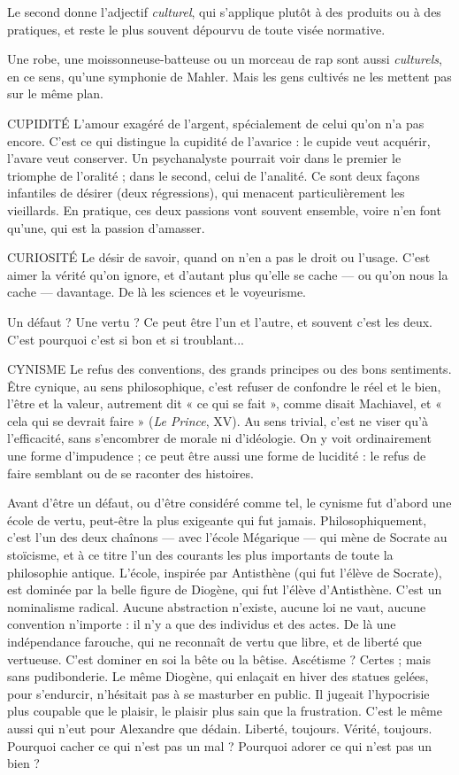 Le second donne l’adjectif {\it culturel}, qui s'applique plutôt à des produits ou
à des pratiques, et reste le plus souvent dépourvu de toute visée normative.

Une robe, une moissonneuse-batteuse ou un morceau de rap sont aussi {\it culturels},
en ce sens, qu’une symphonie de Mahler. Mais les gens cultivés ne les
mettent pas sur le même plan.

CUPIDITÉ L'amour exagéré de l’argent, spécialement de celui qu’on n’a
pas encore. C’est ce qui distingue la cupidité de l’avarice : le
cupide veut acquérir, l’avare veut conserver. Un psychanalyste pourrait voir
dans le premier le triomphe de l’oralité ; dans le second, celui de l’analité. Ce
sont deux façons infantiles de désirer (deux régressions), qui menacent
particulièrement les vieillards.
En pratique, ces deux passions vont souvent ensemble, voire n’en font
qu’une, qui est la passion d’amasser.

CURIOSITÉ Le désir de savoir, quand on n’en a pas le droit ou l’usage.
C’est aimer la vérité qu’on ignore, et d’autant plus qu’elle se
cache — ou qu’on nous la cache — davantage. De là les sciences et le voyeurisme.

Un défaut ? Une vertu ? Ce peut être l’un et l’autre, et souvent c’est les
deux. C’est pourquoi c’est si bon et si troublant...

CYNISME Le refus des conventions, des grands principes ou des bons sentiments.
Être cynique, au sens philosophique, c’est refuser de
confondre le réel et le bien, l'être et la valeur, autrement dit « ce qui se fait »,
comme disait Machiavel, et « cela qui se devrait faire » ({\it Le Prince}, XV). Au sens
trivial, c’est ne viser qu’à l'efficacité, sans s’encombrer de morale ni d’idéologie.
On y voit ordinairement une forme d’impudence ; ce peut être aussi une forme
de lucidité : le refus de faire semblant ou de se raconter des histoires.

Avant d’être un défaut, ou d’être considéré comme tel, le cynisme fut
d’abord une école de vertu, peut-être la plus exigeante qui fut jamais.
Philosophiquement, c’est l’un des deux chaînons — avec l’école Mégarique — qui mène
de Socrate au stoïcisme, et à ce titre l’un des courants les plus importants de
toute la philosophie antique. L'école, inspirée par Antisthène (qui fut l'élève de
Socrate), est dominée par la belle figure de Diogène, qui fut l’élève d’Antisthène.
C’est un nominalisme radical. Aucune abstraction n’existe, aucune loi
ne vaut, aucune convention n'importe : il n’y a que des individus et des actes.
De là une indépendance farouche, qui ne reconnaît de vertu que libre, et de
liberté que vertueuse. C’est dominer en soi la bête ou la bêtise. Ascétisme ?
Certes ; mais sans pudibonderie. Le même Diogène, qui enlaçait en hiver des
statues gelées, pour s’endurcir, n’hésitait pas à se masturber en public. Il jugeait
l’hypocrisie plus coupable que le plaisir, le plaisir plus sain que la frustration.
C’est le même aussi qui n’eut pour Alexandre que dédain. Liberté, toujours.
Vérité, toujours. Pourquoi cacher ce qui n’est pas un mal ? Pourquoi adorer ce
qui n’est pas un bien ?


